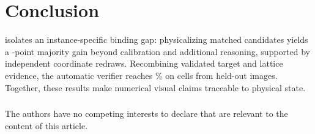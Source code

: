 \section{Conclusion}

\dataset{} isolates an instance-specific binding gap: physicalizing matched candidates yields a \MajorityBalancedGain{}-point majority gain beyond calibration and additional reasoning, supported by independent coordinate redraws. Recombining validated target and lattice evidence, the automatic verifier reaches \FactorialTestPrecision\% on \FactorialTestRouted{} cells from \FactorialTestImages{} held-out images. Together, these results make numerical visual claims traceable to physical state.

\begin{credits}
\subsubsection{\discintname}
The authors have no competing interests to declare that are relevant to the content of this article.
\end{credits}

